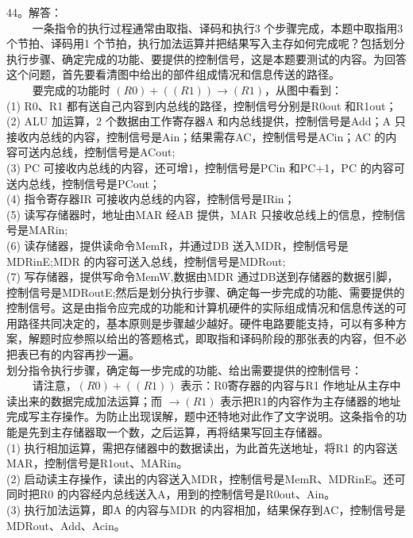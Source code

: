44。解答： \\
$\qquad$ 一条指令的执行过程通常由取指、译码和执行3 个步骤完成，本题中取指用3 个节拍、译码用1 个节拍，执行加法运算并把结果写入主存如何完成呢？包括划分执行步骤、确定完成的功能、要提供的控制信号，这是本题要测试的内容。为回答这个问题，首先要看清图中给出的部件组成情况和信息传送的路径。 \\
$\qquad$ 要完成的功能时 $(R0)+((R1)) \rightarrow (R1)$，从图中看到： \\
(1) R0、R1 都有送自己内容到内总线的路径，控制信号分别是R0out 和R1out； \\
(2) ALU 加运算，2 个数据由工作寄存器A 和内总线提供，控制信号是Add；A 只接收内总线的内容，控制信号是Ain；结果需存AC，控制信号是ACin；AC 的内容可送内总线，控制信号是ACout; \\
(3) PC 可接收内总线的内容，还可增1，控制信号是PCin 和PC+1，PC 的内容可送内总线，控制信号是PCout； \\
(4) 指令寄存器IR 可接收内总线的内容，控制信号是IRin； \\
(5) 读写存储器时，地址由MAR 经AB 提供，MAR 只接收总线上的信息，控制信号是MARin; \\
(6) 读存储器，提供读命令MemR，并通过DB 送入MDR，控制信号是MDRinE;MDR 的内容可送入总线，控制信号是MDRout; \\
(7) 写存储器，提供写命令MemW,数据由MDR 通过DB送到存储器的数据引脚，控制信号是MDRoutE;然后是划分执行步骤、确定每一步完成的功能、需要提供的控制信号。这是由指令应完成的功能和计算机硬件的实际组成情况和信息传送的可用路径共同决定的，基本原则是步骤越少越好。硬件电路要能支持，可以有多种方案，解题时应参照以给出的答题格式，即取指和译码阶段的那张表的内容，但不必把表已有的内容再抄一遍。 \\
划分指令执行步骤，确定每一步完成的功能、给出需要提供的控制信号： \\
$\qquad$ 请注意，$(R0)+((R1))$ 表示：R0寄存器的内容与R1 作地址从主存中读出来的数据完成加法运算；而 $\rightarrow(R1)$ 表示把R1的内容作为主存储器的地址完成写主存操作。为防止出现误解，题中还特地对此作了文字说明。这条指令的功能是先到主存储器取一个数，之后运算，再将结果写回主存储器。 \\
(1) 执行相加运算，需把存储器中的数据读出，为此首先送地址，将R1 的内容送MAR，控制信号是R1out、MARin。 \\
(2) 启动读主存操作，读出的内容送入MDR，控制信号是MemR、MDRinE。还可同时把R0 的内容经内总线送入A，用到的控制信号是R0out、Ain。 \\
(3) 执行加法运算，即A 的内容与MDR 的内容相加，结果保存到AC，控制信号是MDRout、Add、Acin。 \\
